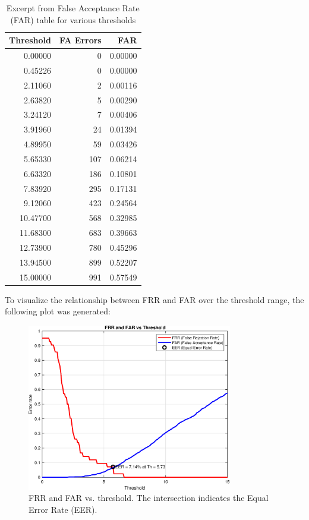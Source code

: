 \documentclass[a4paper,12pt]{article}
\begin{document}
\vspace{1em}
\begin{table}[H]
\centering
\begin{tabular}{@{}rrr@{}}
\toprule
\textbf{Threshold} & \textbf{FA Errors} & \textbf{FAR} \\
\midrule
0.00000  & 0   & 0.00000 \\
0.45226  & 0   & 0.00000 \\
2.11060  & 2   & 0.00116 \\
2.63820  & 5   & 0.00290 \\
3.24120  & 7   & 0.00406 \\
3.91960  & 24  & 0.01394 \\
4.89950  & 59  & 0.03426 \\
5.65330  & 107 & 0.06214 \\
6.63320  & 186 & 0.10801 \\
7.83920  & 295 & 0.17131 \\
9.12060  & 423 & 0.24564 \\
10.47700 & 568 & 0.32985 \\
11.68300 & 683 & 0.39663 \\
12.73900 & 780 & 0.45296 \\
13.94500 & 899 & 0.52207 \\
15.00000 & 991 & 0.57549 \\
\bottomrule
\end{tabular}
\caption{Excerpt from False Acceptance Rate (FAR) table for various thresholds}
\label{tab:far_table}
\end{table}

\vspace{0.5em}
\noindent
To visualize the relationship between FRR and FAR over the threshold range, the following plot was generated:

\begin{figure}[H]
    \centering
    \includegraphics[width=0.8\textwidth]{figures/eer_plot.eps}
    \caption{FRR and FAR vs. threshold. The intersection indicates the Equal Error Rate (EER).}
    \label{fig:frr_far_curve}
\end{figure}
\end{document}
